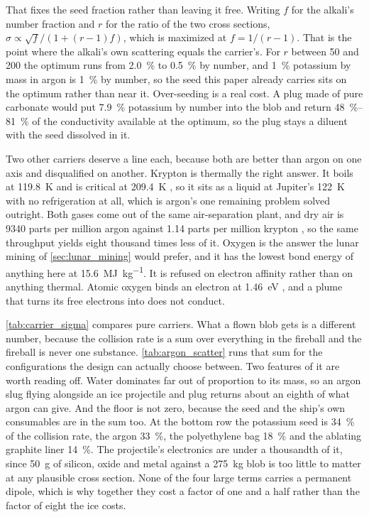 \documentclass{article}
\begin{document}
That fixes the seed fraction rather than leaving it free. Writing $f$ for the alkali's number fraction and $r$ for the ratio of the two cross sections, $\sigma \propto \sqrt{f}/(1 + (r-1)f)$, which is maximized at $f = 1/(r-1)$. That is the point where the alkali's own scattering equals the carrier's. For $r$ between 50 and 200 the optimum runs from \SI{2.0}{\percent} to \SI{0.5}{\percent} by number, and \SI{1}{\percent} potassium by mass in argon is \SI{1}{\percent} by number, so the seed this paper already carries sits on the optimum rather than near it. Over-seeding is a real cost. A plug made of pure carbonate would put \SI{7.9}{\percent} potassium by number into the blob and return \SIrange{48}{81}{\percent} of the conductivity available at the optimum, so the plug stays a diluent with the seed dissolved in it.

Two other carriers deserve a line each, because both are better than argon on one axis and disqualified on another. Krypton is thermally the right answer. It boils at \SI{119.8}{\kelvin} and is critical at \SI{209.4}{\kelvin} \cite{crc_handbook}, so it sits as a liquid at Jupiter's \SI{122}{\kelvin} with no refrigeration at all, which is argon's one remaining problem solved outright. Both gases come out of the same air-separation plant, and dry air is \num{9340} parts per million argon against \num{1.14} parts per million krypton \cite{crc_handbook}, so the same throughput yields eight thousand times less of it. Oxygen is the answer the lunar mining of \autoref{sec:lunar_mining} would prefer, and it has the lowest bond energy of anything here at \SI{15.6}{\mega\joule\per\kilogram}. It is refused on electron affinity rather than on anything thermal. Atomic oxygen binds an electron at \SI{1.46}{\electronvolt} \cite{crc_handbook}, and a plume that turns its free electrons into  does not conduct.


\autoref{tab:carrier_sigma} compares pure carriers. What a flown blob gets is a different number, because the collision rate is a sum over everything in the fireball and the fireball is never one substance. \autoref{tab:argon_scatter} runs that sum for the configurations the design can actually choose between. Two features of it are worth reading off. Water dominates far out of proportion to its mass, so an argon slug flying alongside an ice projectile and plug returns about an eighth of what argon can give. And the floor is not zero, because the seed and the ship's own consumables are in the sum too. At the bottom row the potassium seed is \SI{34}{\percent} of the collision rate, the argon \SI{33}{\percent}, the polyethylene bag \SI{18}{\percent} and the ablating graphite liner \SI{14}{\percent}. The projectile's electronics are under a thousandth of it, since \SI{50}{\gram} of silicon, oxide and metal against a \SI{275}{\kilogram} blob is too little to matter at any plausible cross section. None of the four large terms carries a permanent dipole, which is why together they cost a factor of one and a half rather than the factor of eight the ice costs.
\end{document}

